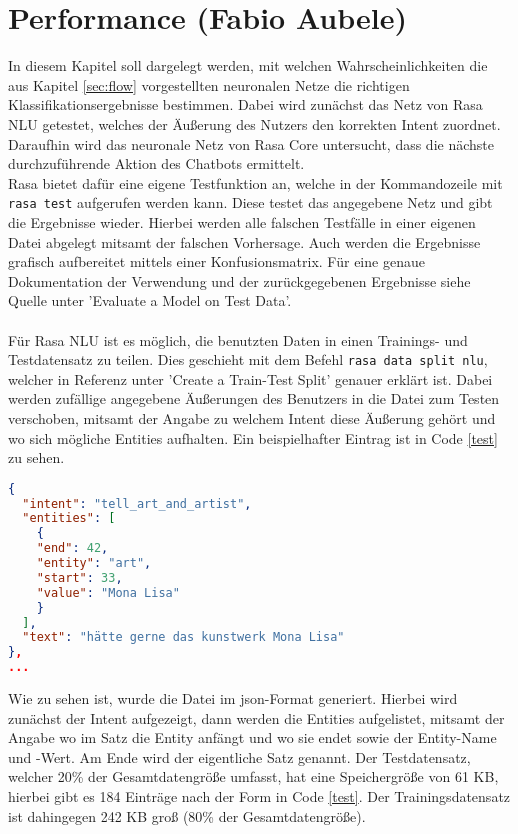 \section{Performance (Fabio Aubele)}
In diesem Kapitel soll dargelegt werden, mit welchen Wahrscheinlichkeiten die aus Kapitel \ref{sec:flow} vorgestellten neuronalen Netze die richtigen Klassifikationsergebnisse bestimmen. Dabei wird zunächst das Netz von Rasa NLU getestet, welches der Äußerung des Nutzers den korrekten Intent zuordnet. Daraufhin wird das neuronale Netz von Rasa Core untersucht, dass die nächste durchzuführende Aktion des Chatbots ermittelt.\\
Rasa bietet dafür eine eigene Testfunktion an, welche in der Kommandozeile mit \texttt{rasa test} aufgerufen werden kann. Diese testet das angegebene Netz und gibt die Ergebnisse wieder. Hierbei werden alle falschen Testfälle in einer eigenen Datei abgelegt mitsamt der falschen Vorhersage. Auch werden die Ergebnisse grafisch aufbereitet mittels einer Konfusionsmatrix. Für eine genaue Dokumentation der Verwendung und der zurückgegebenen Ergebnisse siehe Quelle \cite{command} unter 'Evaluate a Model on Test Data'.\\
\\
Für Rasa NLU ist es möglich, die benutzten Daten in einen Trainings- und Testdatensatz zu teilen. Dies geschieht mit dem Befehl \texttt{rasa data split nlu}, welcher in Referenz \cite{command} unter 'Create a Train-Test Split' genauer erklärt ist. Dabei werden zufällige angegebene Äußerungen des Benutzers in die Datei zum Testen verschoben, mitsamt der Angabe zu welchem Intent diese Äußerung gehört und wo sich mögliche Entities aufhalten. Ein beispielhafter Eintrag ist in Code \ref{test} zu sehen. 
\begin{lstlisting}[caption={Struktur eines Testfalles für Rasa NLU.}, label=test, lineskip=1pt, language=json, morekeywords={intent, entities, text, end, entity, start, value}]
{
  "intent": "tell_art_and_artist",
  "entities": [
    {
    "end": 42,
    "entity": "art",
    "start": 33,
    "value": "Mona Lisa"
    }
  ],
  "text": "hätte gerne das kunstwerk Mona Lisa"
},
...
\end{lstlisting}
Wie zu sehen ist, wurde die Datei im json-Format generiert. Hierbei wird zunächst der Intent aufgezeigt, dann werden die Entities aufgelistet, mitsamt der Angabe wo im Satz die Entity anfängt und wo sie endet sowie der Entity-Name und -Wert. Am Ende wird der eigentliche Satz genannt. Der Testdatensatz, welcher 20\% der Gesamtdatengröße umfasst, hat eine Speichergröße von 61 KB, hierbei gibt es 184 Einträge nach der Form in Code \ref{test}. Der Trainingsdatensatz ist dahingegen 242 KB groß (80\% der Gesamtdatengröße).\\
